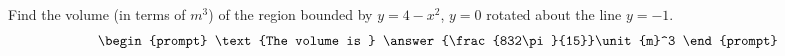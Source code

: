 \documentclass{ximera}
\author{Gregory Hartman \and Matthew Carr}
\begin{document}
\begin{exercise}






Find the volume (in terms of $\unit{m}^3$) of the region bounded by $y=4-x^2$, $y=0$ rotated about the line $y=-1$.
\[
\begin{prompt}
\text{The volume is } \answer{\frac{832\pi}{15}}\unit{m}^3
\end{prompt}
\]




\end{exercise}
\end{document}
